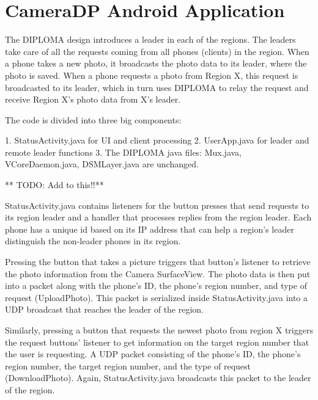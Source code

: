 \chapter{CameraDP Android Application}

The DIPLOMA design introduces a leader in each of the regions.  The leaders take care of all the requests coming from all phones (clients) in the region.  When a phone takes a new photo, it broadcasts the photo data to its leader, where the photo is saved. When a phone requests a photo from Region X, this request is broadcasted to its leader, which in turn uses DIPLOMA to relay the request and receive Region X’s photo data from X’s leader.

The code is divided into three big components: 

1.  StatusActivity.java for UI and client processing
2.  UserApp.java for leader and remote leader functions
3.  The DIPLOMA java files: Mux.java, VCoreDaemon.java, DSMLayer.java are unchanged.

** TODO: Add to this!!**

StatusActivity.java contains listeners for the button presses that send requests to its region leader and a handler that processes replies from the region leader. Each phone has a unique id based on its IP address that can help a region’s leader distinguish the non-leader phones in its region.  

Pressing the button that takes a picture triggers that button’s listener to retrieve the photo information from the Camera SurfaceView. The photo data is then put into a packet along with the phone’s ID, the phone’s region number, and type of request (UploadPhoto). This packet is serialized inside StatusActivity.java into a UDP broadcast that reaches the leader of the region.

Similarly, pressing a button that requests the newest photo from region X triggers the request buttons’ listener to get information on the target region number that the user is requesting. A UDP packet consisting of the phone’s ID, the phone’s region number, the target region number, and the type of request (DownloadPhoto). Again, StatusActivity.java broadcasts this packet to the leader of the region.


